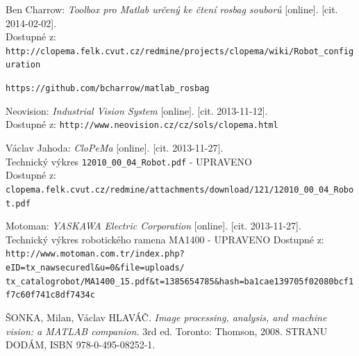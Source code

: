 \documentclass[10pt,a4paper,titlepage,oneside]{report}
\begin{document}
\begin{thebibliography}{00}
   Ben Charrow:
    \emph{Toolbox pro Matlab určený ke čtení rosbag souborů} [online]. [cit. 2014-02-02].\\
    Dostupné z: \verb|http://clopema.felk.cvut.cz/redmine/projects/clopema/wiki/Robot_configuration|  

\verb|https://github.com/bcharrow/matlab_rosbag|

   Neovision:
    \emph{Industrial Vision System} [online]. [cit. 2013-11-12].\\
    Dostupné z: \verb|http://www.neovision.cz/cz/sols/clopema.html|    

   Václav Jahoda:
    \emph{CloPeMa} [online]. [cit. 2013-11-27].\\
    Technický výkres \verb|12010_00_04_Robot.pdf| - UPRAVENO\\
    Dostupné z: \verb|clopema.felk.cvut.cz/redmine/attachments/download/121/12010_00_04_Robot.pdf|    

   Motoman:
    \emph{YASKAWA Electric Corporation} [online]. [cit. 2013-11-27].\\
    Technický výkres robotického ramena MA1400 - UPRAVENO
    Dostupné z: \verb|http://www.motoman.com.tr/index.php?eID=tx_nawsecuredl&u=0&file=uploads/|\\
    \verb|tx_catalogrobot/MA1400_15.pdf&t=1385654785&hash=ba1cae139705f02080bcf1f7c60f741c8df7434c|
    
   ŠONKA, Milan, Václav HLAVÁČ.
    \emph{Image processing, analysis, and machine vision: a MATLAB companion.} 3rd ed. Toronto: Thomson, 2008. STRANU DODÁM, ISBN 978-0-495-08252-1. 

\end{thebibliography}
\end{document}
